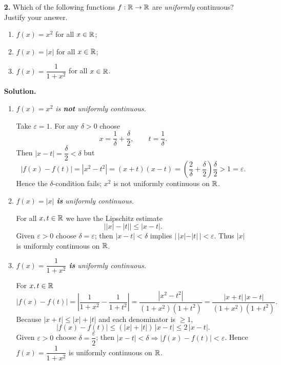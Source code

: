 \documentclass[12pt]{article}
\theoremstyle{definition} %
\theoremstyle{plain} %
\begin{document}
\begin{enumerate}
  \item[\textbf{2.}]  Which of the following functions \(f:\Bbb R\to\Bbb R\)
                      are \emph{uniformly} continuous?  Justify your answer.
        \begin{enumerate}[]
        \item \(f(x)=x^{2}\) for all \(x\in\Bbb R\);
        \item \(f(x)=|x|\) for all \(x\in\Bbb R\);
        \item \(f(x)=\dfrac{1}{1+x^{2}}\) for all \(x\in\Bbb R\).
        \end{enumerate}
  
  \smallskip
  \textbf{Solution.}
  \begin{enumerate}[]
  \item \emph{\(f(x)=x^{2}\) is \textbf{not} uniformly continuous.}
  
        Take \(\varepsilon=1\).
        For any \(\delta>0\) choose
        \[
           x=\frac1\delta+\frac{\delta}{2},
           \qquad
           t=\frac1\delta .
        \]
        Then \( |x-t|=\dfrac{\delta}{2}<\delta \) but
        \[
           |f(x)-f(t)|
              =|x^{2}-t^{2}|
              =(x+t)(x-t)
              =\left(\frac{2}{\delta}+\frac{\delta}{2}\right)\frac{\delta}{2}
              >1=\varepsilon .
        \]
        Hence the \(\delta\)-condition fails; \(x^{2}\) is not uniformly
        continuous on \(\Bbb R\).
  
  \item \emph{\(f(x)=|x|\) \textbf{is} uniformly continuous.}
  
        For all \(x,t\in\Bbb R\) we have the Lipschitz estimate
        \[
           \bigl||x|-|t|\bigr|\le |x-t|.
        \]
        Given \(\varepsilon>0\) choose \(\delta=\varepsilon\); then
        \( |x-t|<\delta \) implies
        \( |\,|x|-|t|\,|<\varepsilon\).
        Thus \(|x|\) is uniformly continuous on \(\Bbb R\).
  
  \item \emph{\(f(x)=\dfrac1{1+x^{2}}\) \textbf{is} uniformly continuous.}
  
        For \(x,t\in\Bbb R\)
        \[
           |f(x)-f(t)|
             =\left|\frac{1}{1+x^{2}}-\frac{1}{1+t^{2}}\right|
             =\frac{|x^{2}-t^{2}|}{(1+x^{2})(1+t^{2})}
             =\frac{|x+t|\,|x-t|}{(1+x^{2})(1+t^{2})}.
        \]
        Because \(|x+t|\le |x|+|t|\) and each denominator is \(\ge1\),
        \[
           |f(x)-f(t)|
             \le (|x|+|t|)\,|x-t|
             \le 2\,|x-t| .
        \]
        Given \(\varepsilon>0\) choose \(\delta=\dfrac{\varepsilon}{2}\);
        then \( |x-t|<\delta\Rightarrow |f(x)-f(t)|<\varepsilon\).
        Hence \(f(x)=\dfrac1{1+x^{2}}\) is uniformly continuous on
        \(\Bbb R\).
  \end{enumerate}
  \end{enumerate}
\end{document}
